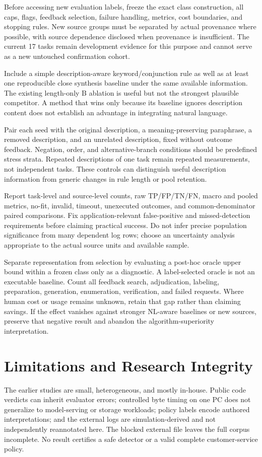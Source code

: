 \documentclass[10pt,twocolumn,letterpaper]{article}
\begin{document}
Before accessing new evaluation labels, freeze the exact class construction, all caps, flags, feedback selection, failure handling, metrics, cost boundaries, and stopping rules. New source groups must be separated by actual provenance where possible, with source dependence disclosed when provenance is insufficient. The current 17 tasks remain development evidence for this purpose and cannot serve as a new untouched confirmation cohort.

Include a simple description-aware keyword/conjunction rule as well as at least one reproducible close synthesis baseline under the same available information. The existing length-only B ablation is useful but not the strongest plausible competitor. A method that wins only because its baseline ignores description content does not establish an advantage in integrating natural language.

Pair each seed with the original description, a meaning-preserving paraphrase, a removed description, and an unrelated description, fixed without outcome feedback. Negation, order, and alternative-branch conditions should be predefined stress strata. Repeated descriptions of one task remain repeated measurements, not independent tasks. These controls can distinguish useful description information from generic changes in rule length or pool retention.

Report task-level and source-level counts, raw TP/FP/TN/FN, macro and pooled metrics, no-fit, invalid, timeout, unexecuted outcomes, and common-denominator paired comparisons. Fix application-relevant false-positive and missed-detection requirements before claiming practical success. Do not infer precise population significance from many dependent log rows; choose an uncertainty analysis appropriate to the actual source units and available sample.

Separate representation from selection by evaluating a post-hoc oracle upper bound within a frozen class only as a diagnostic. A label-selected oracle is not an executable baseline. Count all feedback search, adjudication, labeling, preparation, generation, enumeration, verification, and failed requests. Where human cost or usage remains unknown, retain that gap rather than claiming savings. If the effect vanishes against stronger NL-aware baselines or new sources, preserve that negative result and abandon the algorithm-superiority interpretation.

\section{Limitations and Research Integrity}
The earlier studies are small, heterogeneous, and mostly in-house. Public code verdicts can inherit evaluator errors; controlled byte timing on one PC does not generalize to model-serving or storage workloads; policy labels encode authored interpretations; and the external logs are simulation-derived and not independently reannotated here. The blocked external file leaves the full corpus incomplete. No result certifies a safe detector or a valid complete customer-service policy.
\end{document}
